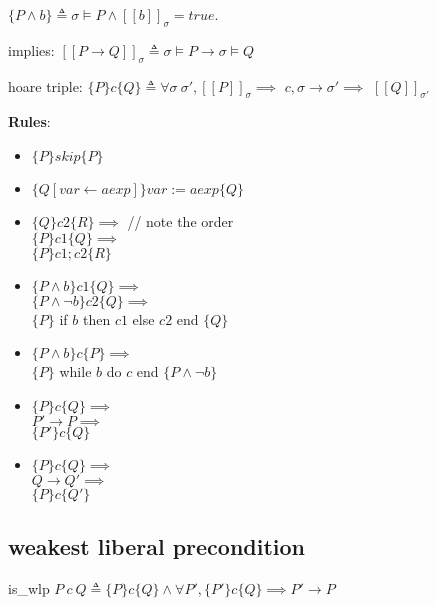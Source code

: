 \documentclass[12pt, fleqn]{article}
\begin{document}
$\{P \land b\} \triangleq \sigma \models P \land [[b]]_\sigma = true$.

\bigskip

implies: $[[P \rightarrow Q]]_\sigma \triangleq \sigma \models P \rightarrow \sigma \models Q$

\bigskip

hoare triple: $\{P\} c \{Q\} \triangleq \forall \sigma \ \sigma', [[P]]_\sigma \implies$
$c, \sigma \rightarrow \sigma' \implies$
$[[Q]]_{\sigma'}$

\bigskip

\textbf{Rules}:

\begin{itemize}
\item %
  $\{P\} skip \{P\}$

\item %
  $\{Q[var \leftarrow aexp]\} var := aexp \{Q\}$

\item %
  $\{Q\} c2 \{R\} \implies$ // note the order\\
  $\{P\} c1 \{Q\} \implies$\\
  $\{P\} c1; c2 \{R\}$

\item %
  $\{P \land b\} c1 \{Q\} \implies$\\
  $\{P \land \lnot b\} c2 \{Q\} \implies$\\
  $\{P\}$ if $b$ then $c1$ else $c2$ end $\{Q\}$

\item %
  $\{P \land b\} c \{P\} \implies$\\
  $\{P\}$ while $b$ do $c$ end $\{P \land \lnot b\}$

\item %
  $\{P\} c \{Q\} \implies$\\
  $P' \rightarrow P \implies$\\
  $\{P'\} c \{Q\}$

\item %
  $\{P\} c \{Q\} \implies$\\
  $Q \rightarrow Q' \implies$\\
  $\{P\} c \{Q'\}$
\end{itemize}


\subsection{weakest liberal precondition}

is\_wlp $P \ c \ Q \triangleq \{P\} c \{Q\} \land \forall P', \{P'\} c \{Q\} \implies P' \rightarrow P$
\end{document}
